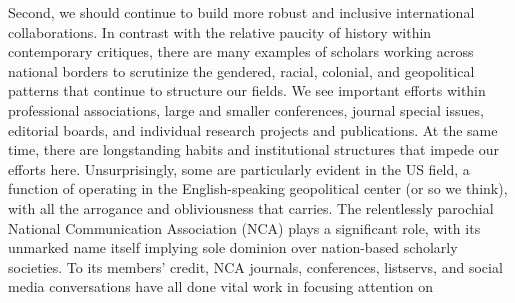 \documentclass{tufte-handout}
\begin{document}
Second, we should continue to build more robust and inclusive
international collaborations. In contrast with the relative paucity of
history within contemporary critiques, there are many examples of
scholars working across national borders to scrutinize the gendered,
racial, colonial, and geopolitical patterns that continue to structure
our fields. We see important efforts within professional associations,
large and smaller conferences, journal special issues, editorial boards,
and individual research projects and publications. At the same time,
there are longstanding habits and institutional structures that impede
our efforts here. Unsurprisingly, some are particularly evident in the
US field, a function of operating in the English-speaking geopolitical
center (or so we think), with all the arrogance and obliviousness that
carries. The relentlessly parochial National Communication Association
(NCA) plays a significant role, with its unmarked name itself implying
sole dominion over nation-based scholarly societies. To its members'
credit, NCA journals, conferences, listservs, and social media
conversations have all done vital work in focusing attention on
\end{document}
